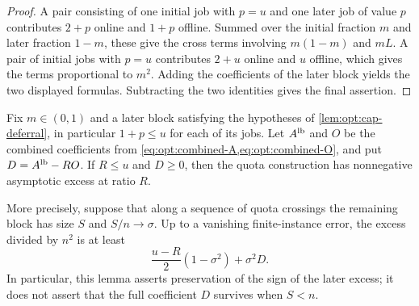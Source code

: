 \begin{proof}
A pair consisting of one initial job with $p=u$ and one later job of value $p$
contributes $2+p$ online and $1+p$ offline.  Summed over the initial fraction $m$
and later fraction $1-m$, these give the cross terms involving $m(1-m)$ and
$mL$.
A pair of initial jobs with $p=u$ contributes $2+u$ online and $u$ offline,
which gives the terms proportional to $m^2$.  Adding the coefficients of the
later block yields the two displayed formulas.
Subtracting the two identities gives the final assertion.
\end{proof}

\begin{lemma}
\label{lem:opt:cap-quota}
Fix $m\in(0,1)$ and a later block satisfying the hypotheses of
\cref{lem:opt:cap-deferral}, in particular $1+p\le u$ for each of its jobs.
Let $A^{\rm lb}$ and $O$ be the combined coefficients from
\cref{eq:opt:combined-A,eq:opt:combined-O}, and put
$D=A^{\rm lb}-R O$.  If $R\le u$ and $D\ge0$, then the quota construction
has nonnegative asymptotic excess at ratio $R$.

More precisely, suppose that along a sequence of quota crossings the
remaining block has size $S$ and $S/n\to\sigma$.  Up to a vanishing
finite-instance error, the excess divided by $n^2$ is at least
\begin{equation}
 \frac{u-R}{2}(1-\sigma^2)+\sigma^2D.
 \label{eq:opt:cap-quota-correct-excess}
\end{equation}
In particular, this lemma asserts preservation of the sign of the later
excess; it does not assert that the full coefficient $D$ survives when
$S<n$.
\end{lemma}

